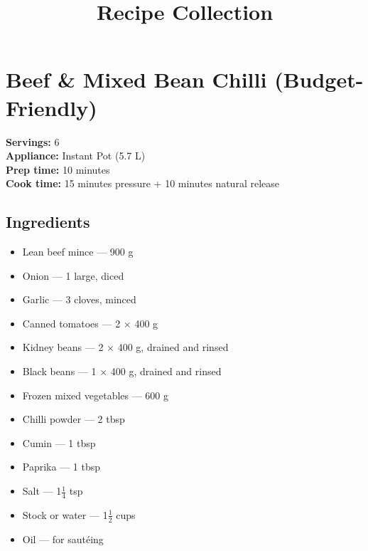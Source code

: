 \documentclass[11pt,a4paper]{article}
\title{Recipe Collection}
\author{}
\date{}
\begin{document}





\section*{Beef \& Mixed Bean Chilli (Budget-Friendly)}

\textbf{Servings:} 6 \\
\textbf{Appliance:} Instant Pot (5.7 L) \\
\textbf{Prep time:} 10 minutes \\
\textbf{Cook time:} 15 minutes pressure + 10 minutes natural release

\vspace{0.5em}

\subsection*{Ingredients}
\begin{itemize}
    \item Lean beef mince — 900 g
    \item Onion — 1 large, diced
    \item Garlic — 3 cloves, minced
    \item Canned tomatoes — 2 $\times$ 400 g
    \item Kidney beans — 2 $\times$ 400 g, drained and rinsed
    \item Black beans — 1 $\times$ 400 g, drained and rinsed
    \item Frozen mixed vegetables — 600 g
    \item Chilli powder — 2 tbsp
    \item Cumin — 1 tbsp
    \item Paprika — 1 tbsp
    \item Salt — 1$\tfrac{1}{4}$ tsp
    \item Stock or water — 1$\tfrac{1}{2}$ cups
    \item Oil — for sautéing
\end{itemize}

\vspace{0.5em}
\end{document}
